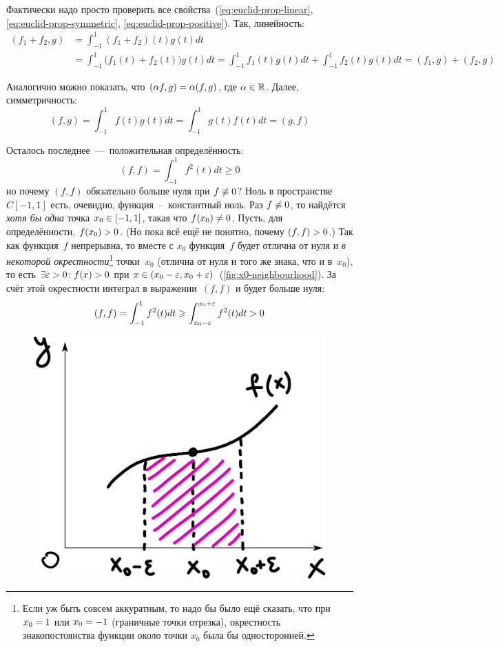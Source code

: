 \documentclass[a4paper,12pt]{article}
\begin{document}
  \begin{solution}
    Фактически надо просто проверить все свойства~(\ref{eq:euclid-prop-linear}, \ref{eq:euclid-prop-symmetric}, \ref{eq:euclid-prop-positive}).
    Так, линейность:
    \begin{equation}
    \begin{split}
      (f_1 + f_2, g) &= \int_{-1}^{1} (f_1 + f_2)(t) g(t) dt\\
      &= \int_{-1}^{1} \bigl(f_1(t) + f_2(t)\bigr) g(t) dt
      = \int_{-1}^{1} f_1(t) g(t) dt + \int_{-1}^{1} f_2(t) g(t) dt
      = (f_1, g) + (f_2, g)
    \end{split}
    \end{equation}
    
    Аналогично можно показать, что $(\alpha f, g) \hm= \alpha (f, g)$, где $\alpha \hm\in \RR$.
    Далее, симметричность:
    \[
      (f, g) = \int_{-1}^{1} f(t) g(t) dt
      = \int_{-1}^{1} g(t) f(t) dt
      = (g, f)
    \]
    
    Осталось последнее~---~положительная определённость:
    \[
      (f, f) = \int_{-1}^{1} f^2(t) dt \geq 0
    \]
    но почему $(f, f)$ обязательно больше нуля при $f \hm{\not\equiv} 0$?
    Ноль в пространстве $C[-1, 1]$ есть, очевидно, функция~--~константный ноль.
    Раз $f \hm{\not\equiv} 0$, то найдётся \emph{хотя бы одна} точка $x_0 \hm\in [-1, 1]$, такая что $f(x_0) \hm{\not=} 0$.
    Пусть, для определённости, $f(x_0) \hm> 0$.
    (Но пока всё ещё не понятно, почему $(f, f) \hm> 0$.)
    Так как функция~$f$ непрерывна, то вместе с $x_0$ функция~$f$ будет отлична от нуля и \emph{в некоторой окрестности}\footnote{Если уж быть совсем аккуратным, то надо бы было ещё сказать, что при $x_0 \hm= 1$ или $x_0 \hm= -1$ (граничные точки отрезка), окрестность знакопостоянства функции около точки $x_0$ была бы односторонней.} точки~$x_0$ (отлична от нуля и того же знака, что и в~$x_0$), то есть $\exists \eps \hm> 0 \colon f(x) \hm> 0$ при $x \hm\in (x_0 \hm- \eps, x_0 \hm+ \eps)$~(\ref{fig:x0-neighbourhood}).
    За счёт этой окрестности интеграл в выражении~$(f, f)$ и будет больше нуля:
    \[
      (f, f) = \int_{-1}^{1} f^2(t) dt \geqslant \int_{x_0 - \varepsilon}^{x_0 + \varepsilon} f^2(t) dt > 0
    \]
    
    \begin{figure}[h!]
      \centering
    
      \includegraphics[width=0.6\columnwidth]{x0-neighbourhood}
    

\end{figure}
\end{solution}
\end{document}
